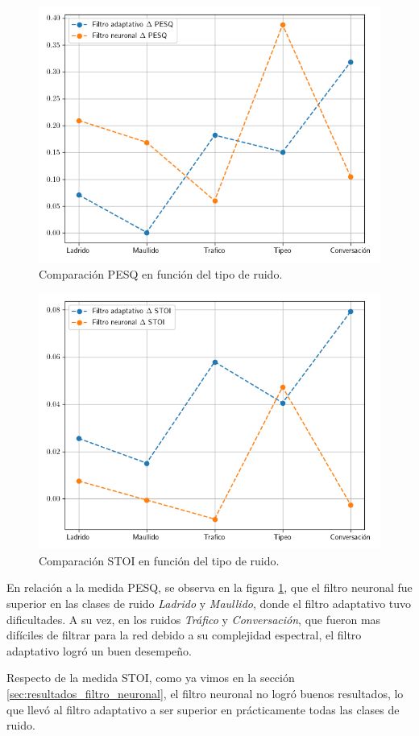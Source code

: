\begin{figure}
	\centering
	\centerline{\includegraphics[scale=0.75]{images/ch8/comparison_pesq_by_noise.png}}
	\caption{Comparación PESQ en función del tipo de ruido.}
	\label{fig:ch8_pesq_comparison_by_noise}
\end{figure}

\begin{figure}
	\centering
	\centerline{\includegraphics[scale=0.75]{images/ch8/comparison_stoi_by_noise.png}}
	\caption{Comparación STOI en función del tipo de ruido.}
	\label{fig:ch8_stoi_comparison_by_noise}
\end{figure}

En relación a la medida PESQ, se observa en la figura \ref{fig:ch8_pesq_comparison_by_noise}, que el filtro neuronal fue superior en las clases de ruido \emph{Ladrido} y \emph{Maullido}, donde el filtro adaptativo tuvo dificultades. A su vez, en los ruidos \emph{Tráfico} y \emph{Conversación}, que fueron mas difíciles de filtrar para la red debido a su complejidad espectral, el filtro adaptativo logró un buen desempeño.

Respecto de la medida STOI, como ya vimos en la sección \ref{sec:resultados_filtro_neuronal}, el filtro neuronal no logró buenos resultados, lo que llevó al filtro adaptativo a ser superior en prácticamente todas las clases de ruido.